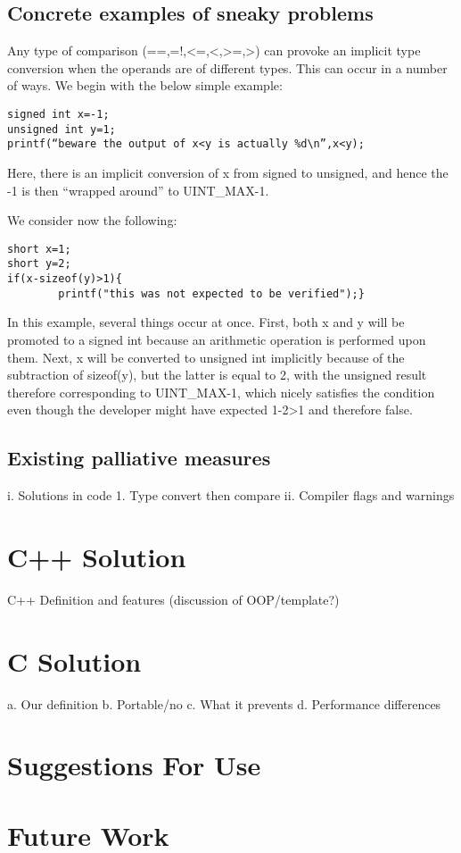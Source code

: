 \documentclass[11pt,letterpaper]{article}
\begin{document}
\subsection{Concrete examples of sneaky problems}
Any type of comparison (==,=!,\textless=,\textless,\textgreater=,\textgreater) can provoke an implicit type conversion when the operands are of different types. This can occur in a number of ways. We begin with the below simple example:

\begin{lstlisting}[style=CStyle]
signed int x=-1;
unsigned int y=1;
printf(“beware the output of x<y is actually %d\n”,x<y);
\end{lstlisting}


Here, there is an implicit conversion of x from signed to unsigned, and hence the -1 is then “wrapped around” to UINT_MAX-1. 

We consider now the following:

\begin{lstlisting}[style=CStyle]
short x=1;
short y=2;
if(x-sizeof(y)>1){
  		printf("this was not expected to be verified");}
\end{lstlisting}

In this example, several things occur at once. First, both x and y will be promoted to a signed int because an arithmetic operation is performed upon them. Next, x will be converted to unsigned int implicitly because of the subtraction of sizeof(y), but the latter is equal to 2, with the unsigned result therefore corresponding to UINT\_MAX-1, which nicely satisfies the condition even though the developer might have expected 1-2>1 and therefore false.

\subsection{Existing palliative measures}


i.	Solutions in code
1.	Type convert then compare
ii.	Compiler flags and warnings

\section{C++ Solution}
\label{sec:cppimplementation}

C++ Definition and features (discussion of OOP/template?)

\blindtext
{}

\section{C Solution}
\label{sec:cimplementation}
a.	Our definition
b.	Portable/no
c.	What it prevents
d.	Performance differences

\section{Suggestions For Use}
\label{sec:suggestions}

\section{Future Work}
\label{sec:futurework}



\printindex
\end{document}
